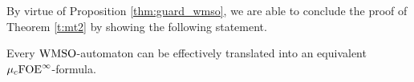 By virtue of Proposition \ref{thm:guard_wmso}, we are able to conclude the proof of Theorem \ref{t:mt2} by showing the following statement.
\begin{proposition}\label{thm:wmsoauttof}
Every $\mathrm{WMSO}$-automaton can be effectively translated into an equivalent $\mu_{c}{\mathrm{FOE}}^\infty$-formula.
\end{proposition}
%
%
%
%
